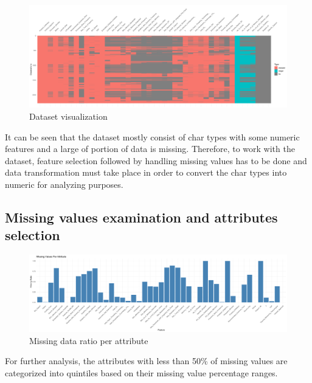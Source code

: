 \begin{figure}[h]
    \centering
    \includegraphics[width=16cm]{graphics/visdat.png}
    \caption*{Dataset visualization}
 \end{figure}

It can be seen that the dataset mostly consist of char types with some numeric features and a large of portion of data is missing. Therefore, to work with the dataset, feature selection followed by handling missing values has to be done and data transformation must take place in order to convert the char types into numeric for analyzing purposes.\\

\subsection{Missing values examination and attributes selection}

\begin{figure}[h]
    \centering
    \includegraphics[width=16cm]{graphics/missingval.png}
    \caption*{Missing data ratio per attribute}
 \end{figure}

For further analysis, the attributes with less than 50\% of missing values are categorized into quintiles based on their missing value percentage ranges.


